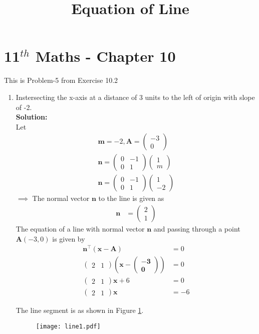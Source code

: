 \documentclass[journal,10pt,twocolumn]{article}
\providecommand{\brak}[1]{\ensuremath{\left(#1\right)}}
\newcommand{\solution}{\noindent \textbf{Solution: }}
\newcommand{\myvec}[1]{\ensuremath{\begin{pmatrix}#1\end{pmatrix}}}
\let\vec\mathbf
\begin{document}
\begin{center}
\title{\textbf{Equation  of Line}}
\date{\vspace{-5ex}} %
\maketitle
\end{center}
\setcounter{page}{1}

\section{11$^{th}$ Maths - Chapter 10}
This is Problem-5 from Exercise 10.2
\begin{enumerate}
\item Instersecting the x-axis at a distance of 3 units to the left of origin with slope of -2.
\\
\solution 
\\
Let
\begin{align}
\vec{m}=-2,\vec{A}=\myvec{-3\\0}\\
\vec{n}=\myvec{0&-1\\0&1}\myvec{1\\m}\\ 
\vec{n}=\myvec{0&-1\\0&1}\myvec{1\\-2}
\end{align}
$\implies$ The normal vector $\vec{n}$ to the line is given as
\begin{align}
\vec{n} &=  \myvec{2 \\1} 
\end{align}
The equation of a line with normal vector $\vec{n}$ and passing through a point $\vec{A}(-3,0)$ is given by
\begin{align}
	\vec{n}^\top\brak{\vec{x}-\vec{A}} &= 0 \\
	\myvec { 2 & 1 } \brak{ \vec{ x  - \myvec{ -3 \\ 0}}}  &= 0  \\
	\myvec{ 2 & 1} \vec{x} +6 &= 0 \\
        \label{eq:1}
	\myvec{ 2 & 1} \vec{x}  &= -6
\end{align}

 The line segment is as shown in Figure \ref{fig:Fig1}.
\begin{figure}[!h]
	\begin{center}
		\texttt{[image: line1.pdf]}
	\end{center}
\caption{}
\label{fig:Fig1}
\end{figure}

\end{enumerate}
\end{document}
